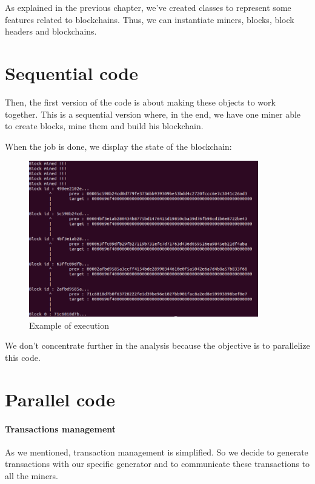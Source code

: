 As explained in the previous chapter, we've created classes to represent some features related to blockchains. Thus, we can instantiate miners, blocks, block headers and blockchains.

\section{Sequential code}

Then, the first version of the code is about making these objects to work together. This is a sequential version where, in the end, we have one miner able to create blocks, mine them and build his blockchain.

When the job is done, we display the state of the blockchain: \newline

\begin{figure}[ht]
\centering
\includegraphics[width=10cm]{Figures/sequentialCode}
\caption{Example of execution}
\end{figure}
\medskip

We don't concentrate further in the analysis because the objective is to parallelize this code.

\section{Parallel code}

\paragraph{Transactions management}

As we mentioned, transaction management is simplified. So we decide to generate transactions with our specific generator and to communicate these transactions to all the miners. \newline

